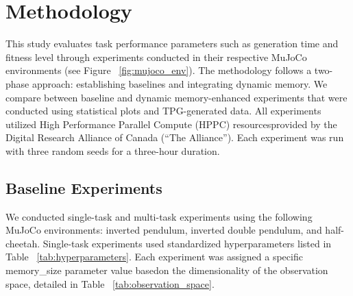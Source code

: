 \documentclass[sigconf]{acmart}
\begin{document}
\section{Methodology}


This study evaluates task performance parameters such as generation time and 
fitness level through experiments conducted in their respective MuJoCo environments 
(see Figure ~\ref{fig:mujoco_env}). The methodology follows a two-phase approach: establishing baselines
and integrating dynamic memory. We compare between baseline and dynamic memory-enhanced
experiments that were conducted using statistical plots and TPG-generated data. All
experiments utilized High Performance Parallel Compute (HPPC) resourcesprovided by the
Digital Research Alliance of Canada (“The Alliance”). Each experiment was run with three
random seeds for a three-hour duration.

\subsection{Baseline Experiments}
We conducted single-task and multi-task experiments using the following MuJoCo environments:
inverted pendulum, inverted double pendulum, and half-cheetah. Single-task experiments used standardized
hyperparameters listed in Table ~\ref{tab:hyperparameters}. Each experiment was assigned a specific memory\_size 
parameter value basedon the dimensionality of the observation space, detailed in Table ~\ref{tab:observation_space}.
\end{document}
